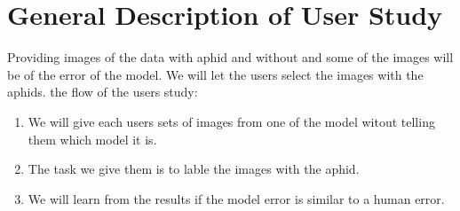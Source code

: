 \documentclass{article}
\begin{document}
\section*{General Description of User Study}
Providing images of the data with aphid and without and some of the images will be of the error of the model. We will let the users select the images with the aphids. the flow of the users study: 
\begin{enumerate}
  \item We will give each users sets of images from one of the model witout telling them which model it is.
  \item The task we give them is to lable the images with the aphid.
  \item We will learn from the results if the model error is similar to a human error.
\end{enumerate}
\end{document}
